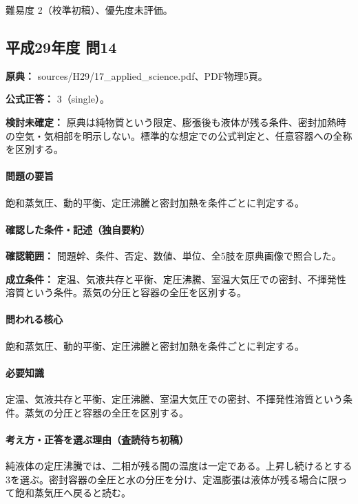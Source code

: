 \par 難易度 2（校準初稿）、優先度未評価。

\subsection{平成29年度 問14}
\label{q:h29-reg-applied-14}

\noindent\textbf{原典：} sources/H29/17\_applied\_science.pdf、PDF物理5頁。

\textbf{公式正答：} 3（single）。

\par\textbf{検討未確定：} 原典は純物質という限定、膨張後も液体が残る条件、密封加熱時の空気・気相部を明示しない。標準的な想定での公式判定と、任意容器への全称を区別する。

\paragraph{問題の要旨} 飽和蒸気圧、動的平衡、定圧沸騰と密封加熱を条件ごとに判定する。

\paragraph{確認した条件・記述（独自要約）}\mbox{}\par

\noindent\textbf{確認範囲：} 問題幹、条件、否定、数値、単位、全5肢を原典画像で照合した。\par

\noindent\textbf{成立条件：} 定温、気液共存と平衡、定圧沸騰、室温大気圧での密封、不揮発性溶質という条件。蒸気の分圧と容器の全圧を区別する。\par

\paragraph{問われる核心} 飽和蒸気圧、動的平衡、定圧沸騰と密封加熱を条件ごとに判定する。

\paragraph{必要知識} 定温、気液共存と平衡、定圧沸騰、室温大気圧での密封、不揮発性溶質という条件。蒸気の分圧と容器の全圧を区別する。

\paragraph{考え方・正答を選ぶ理由（査読待ち初稿）} 純液体の定圧沸騰では、二相が残る間の温度は一定である。上昇し続けるとする3を選ぶ。密封容器の全圧と水の分圧を分け、定温膨張は液体が残る場合に限って飽和蒸気圧へ戻ると読む。

